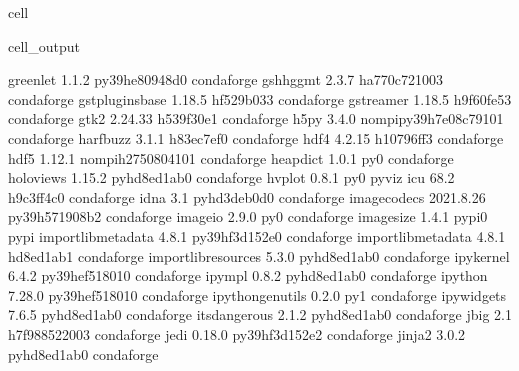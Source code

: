 \documentclass[letterpaper,table,10pt,english]{jupyterBook}
\begin{document}
\begin{sphinxuseclass}{cell}
\begin{sphinxVerbatimOutput}
\begin{sphinxuseclass}{cell_output}
\begin{sphinxVerbatim}[commandchars=\\\{\}]
greenlet                  1.1.2            py39he80948d\PYGZus{}0    conda\PYGZhy{}forge
gshhg\PYGZhy{}gmt                 2.3.7             ha770c72\PYGZus{}1003    conda\PYGZhy{}forge
gst\PYGZhy{}plugins\PYGZhy{}base          1.18.5               hf529b03\PYGZus{}3    conda\PYGZhy{}forge
gstreamer                 1.18.5               h9f60fe5\PYGZus{}3    conda\PYGZhy{}forge
gtk2                      2.24.33              h539f30e\PYGZus{}1    conda\PYGZhy{}forge
h5py                      3.4.0           nompi\PYGZus{}py39h7e08c79\PYGZus{}101    conda\PYGZhy{}forge
harfbuzz                  3.1.1                h83ec7ef\PYGZus{}0    conda\PYGZhy{}forge
hdf4                      4.2.15               h10796ff\PYGZus{}3    conda\PYGZhy{}forge
hdf5                      1.12.1          nompi\PYGZus{}h2750804\PYGZus{}101    conda\PYGZhy{}forge
heapdict                  1.0.1                      py\PYGZus{}0    conda\PYGZhy{}forge
holoviews                 1.15.2             pyhd8ed1ab\PYGZus{}0    conda\PYGZhy{}forge
hvplot                    0.8.1                      py\PYGZus{}0    pyviz
icu                       68.2                 h9c3ff4c\PYGZus{}0    conda\PYGZhy{}forge
idna                      3.1                pyhd3deb0d\PYGZus{}0    conda\PYGZhy{}forge
imagecodecs               2021.8.26        py39h571908b\PYGZus{}2    conda\PYGZhy{}forge
imageio                   2.9.0                      py\PYGZus{}0    conda\PYGZhy{}forge
imagesize                 1.4.1                    pypi\PYGZus{}0    pypi
importlib\PYGZhy{}metadata        4.8.1            py39hf3d152e\PYGZus{}0    conda\PYGZhy{}forge
importlib\PYGZus{}metadata        4.8.1                hd8ed1ab\PYGZus{}1    conda\PYGZhy{}forge
importlib\PYGZus{}resources       5.3.0              pyhd8ed1ab\PYGZus{}0    conda\PYGZhy{}forge
ipykernel                 6.4.2            py39hef51801\PYGZus{}0    conda\PYGZhy{}forge
ipympl                    0.8.2              pyhd8ed1ab\PYGZus{}0    conda\PYGZhy{}forge
ipython                   7.28.0           py39hef51801\PYGZus{}0    conda\PYGZhy{}forge
ipython\PYGZus{}genutils          0.2.0                      py\PYGZus{}1    conda\PYGZhy{}forge
ipywidgets                7.6.5              pyhd8ed1ab\PYGZus{}0    conda\PYGZhy{}forge
itsdangerous              2.1.2              pyhd8ed1ab\PYGZus{}0    conda\PYGZhy{}forge
jbig                      2.1               h7f98852\PYGZus{}2003    conda\PYGZhy{}forge
jedi                      0.18.0           py39hf3d152e\PYGZus{}2    conda\PYGZhy{}forge
jinja2                    3.0.2              pyhd8ed1ab\PYGZus{}0    conda\PYGZhy{}forge

\end{sphinxVerbatim}
\end{sphinxuseclass}
\end{sphinxVerbatimOutput}
\end{sphinxuseclass}
\end{document}

